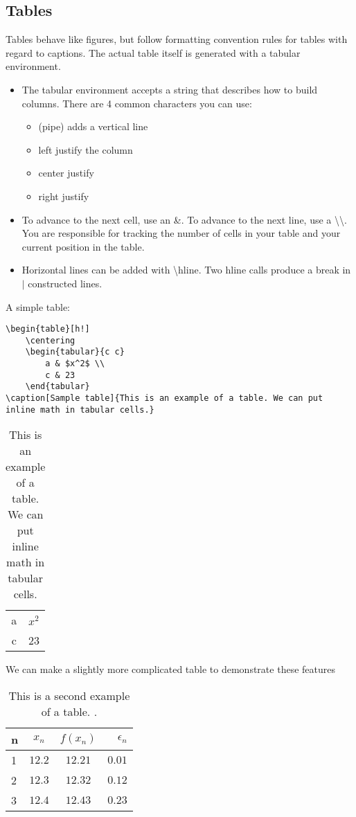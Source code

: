 \documentclass[11pt]{article}
\begin{document}
\subsection{Tables}
Tables behave like figures, but follow formatting convention rules for tables with regard to captions. The actual table itself is generated with a tabular environment. 
\begin{itemize}
	\item The tabular environment accepts a string that describes how to build columns. There are 4 common characters you can use:
	\begin{itemize}
		\item[$\vert$] (pipe) adds a vertical line
		\item[l] left justify the column
		\item[c] center justify
		\item[r] right justify
	\end{itemize}
	\item To advance to the next cell, use an \&. To advance to the next line, use a \textbackslash\textbackslash. You are responsible for tracking the number of cells in your table and your current position in the table. 
	\item Horizontal lines can be added with \textbackslash hline. Two hline calls produce a break in $\vert$ constructed lines. 
\end{itemize}
A simple table:
\begin{verbatim}
\begin{table}[h!]
	\centering
	\begin{tabular}{c c}
		a & $x^2$ \\
		c & 23
	\end{tabular}
\caption[Sample table]{This is an example of a table. We can put inline math in tabular cells.}
\end{verbatim}
\begin{table}[h!]
	\centering
	\begin{tabular}{c c}
		a & $x^2$ \\
		c & 23
	\end{tabular}
\caption[Sample table]{This is an example of a table. We can put inline math in tabular cells.}
\end{table}
We can make a slightly more complicated table to demonstrate these features
\begin{table}[h!]
	\centering
	\begin{tabular}{|l|c c r|} \hline
		n & $x_n$ & $f(x_n)$ & $\epsilon_n$ \\  \hline \hline
		1 & $12.2$ & $12.21$ & $0.01$ \\
		2 & $12.3$ & $12.32$ & $0.12$ \\
		3 & $12.4$ & $12.43$ & $0.23$ \\
		\hline 
	\end{tabular}
	\caption[Advanced table]{This is a second example of a table. .}
\end{table}
\end{document}
